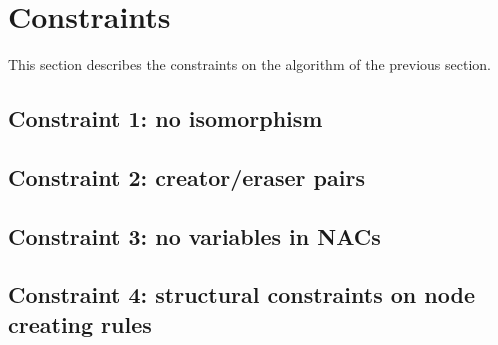 \section{Constraints}

This section describes the constraints on the algorithm of the previous section.

\subsection{Constraint 1: no isomorphism}

\subsection{Constraint 2: creator/eraser pairs}

\subsection{Constraint 3: no variables in NACs}

\subsection{Constraint 4: structural constraints on node creating rules}
